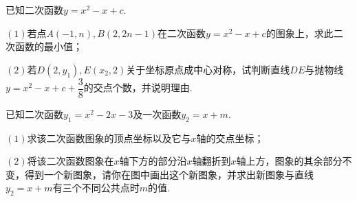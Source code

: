 \documentclass[10pt]{ctexart}
\begin{document}
\begin{dkyi}{}{}
 已知二次函数$y=x^2-x+c$.
 
 $(1)$若点$A(-1,n),B(2,2n-1)$在二次函数$y=x^2-x+c$的图象上，求此二次函数的最小值；
 
 $(2)$若$D(2,y_1),E(x_2,2)$关于坐标原点成中心对称，试判断直线$DE$与抛物线$y=x^2-x+c+\dfrac{3}{8}$的交点个数，并说明理由.
\end{dkyi}
\begin{jply}{}{}
  已知二次函数$y_1=x^2-2x-3$及一次函数$y_2=x+m$.
  
  $(1)$求该二次函数图象的顶点坐标以及它与$x$轴的交点坐标；
  
  $(2)$将该二次函数图象在$x$轴下方的部分沿$x$轴翻折到$x$轴上方，图象的其余部分不变，得到一个新图象，请你在图中画出这个新图象，并求出新图象与直线$y_2=x+m$有三个不同公共点时$m$的值.
\end{jply}
\end{document}

